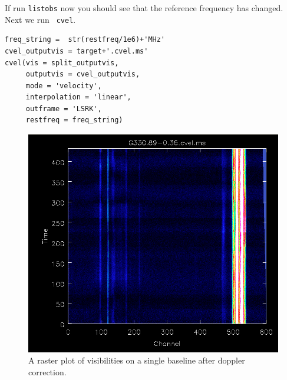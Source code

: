 \documentclass[force,almostfull,justified]{tufte-book}
\begin{document}
If run {\tt listobs} now you should see that the reference frequency has changed.  Next we run {\tt
cvel}.

\begin{casacmd}
\begin{verbatim}
freq_string =  str(restfreq/1e6)+'MHz'
cvel_outputvis = target+'.cvel.ms'
cvel(vis = split_outputvis,
     outputvis = cvel_outputvis,
     mode = 'velocity',
     interpolation = 'linear',
     outframe = 'LSRK',
     restfreq = freq_string)
\end{verbatim}
\end{casacmd}

\begin{figure}
  \includegraphics[width=\textwidth]{images/doppler_corrected}
  \caption[]{A raster plot of visibilities on a single baseline after doppler correction.}
  \forceversofloat
  \label{fig:doppler_corrected}
\end{figure}
\end{document}
